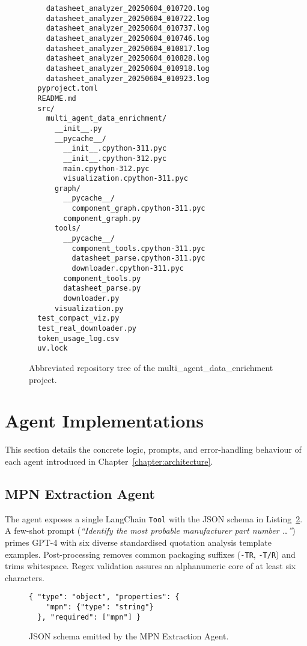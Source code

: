 \begin{figure}[H]
\begin{minipage}{0.9\textwidth}
\begin{verbatim}
    datasheet_analyzer_20250604_010720.log
    datasheet_analyzer_20250604_010722.log
    datasheet_analyzer_20250604_010737.log
    datasheet_analyzer_20250604_010746.log
    datasheet_analyzer_20250604_010817.log
    datasheet_analyzer_20250604_010828.log
    datasheet_analyzer_20250604_010918.log
    datasheet_analyzer_20250604_010923.log
  pyproject.toml
  README.md
  src/
    multi_agent_data_enrichment/
      __init__.py
      __pycache__/
        __init__.cpython-311.pyc
        __init__.cpython-312.pyc
        main.cpython-312.pyc
        visualization.cpython-311.pyc
      graph/
        __pycache__/
          component_graph.cpython-311.pyc
        component_graph.py
      tools/
        __pycache__/
          component_tools.cpython-311.pyc
          datasheet_parse.cpython-311.pyc
          downloader.cpython-311.pyc
        component_tools.py
        datasheet_parse.py
        downloader.py
      visualization.py
  test_compact_viz.py
  test_real_downloader.py
  token_usage_log.csv
  uv.lock
\end{verbatim}
\end{minipage}
\caption{Abbreviated repository tree of the multi\_agent\_data\_enrichment project.}
\label{lst:tree}
\end{figure}

\section{Agent Implementations}
This section details the concrete logic, prompts, and error-handling behaviour of each agent introduced in Chapter~\ref{chapter:architecture}.

\subsection{MPN Extraction Agent}
The agent exposes a single LangChain \texttt{Tool} with the JSON schema in Listing~\ref{lst:mpn_schema}.  A few-shot prompt (\emph{``Identify the most probable manufacturer part number …''}) primes GPT-4 with six diverse standardised quotation analysis template examples.  Post-processing removes common packaging suffixes (\texttt{-TR}, \texttt{-T/R}) and trims whitespace.  Regex validation assures an alphanumeric core of at least six characters.
\begin{figure}[H]
\centering
\begin{minipage}{0.9\textwidth}
\begin{verbatim}
{ "type": "object", "properties": {
    "mpn": {"type": "string"}
  }, "required": ["mpn"] }
\end{verbatim}
\end{minipage}
\caption{JSON schema emitted by the MPN Extraction Agent.}
\label{lst:mpn_schema}
\end{figure}

